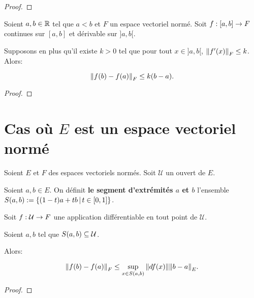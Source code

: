 \ifdefined\outputproof
\begin{proof}

\end{proof}
\fi

\begin{corollary}
	Soient $a, b \in \mathbb{R}$ tel que $a < b$ et $F$ un espace vectoriel normé.
	Soit $f : [a, b] \rightarrow F$ continues sur $[a, b]$ et dérivable sur
	$]a, b[$.

	Supposons en plus qu'il existe $k > 0$ tel que pour tout $x \in ]a, b[$,
	$\norm{f'(x)}_{F} \leq k$. Alors:

	\begin{equation*}
		\norm{f(b) - f(a)}_{F} \leq k (b - a).
	\end{equation*}
\end{corollary}

\ifdefined\outputproof
\begin{proof}

\end{proof}
\fi

\section{Cas où $E$ est un espace vectoriel normé}

Soient $E$ et $F$ des espaces vectoriels normés.
Soit $\mathcal{U}$ un ouvert de $E$.

\begin{definition}
	Soient $a, b \in E$. On définit \textbf{le segment d'extrémités $a$ et $b$}
	l'ensemble $S(a, b) := \left\{(1 - t) a + t b \, | \, t \in [0, 1] \right\}$.
\end{definition}

\begin{theorem} 
	Soit $f : \mathcal{U} \rightarrow F$ une application différentiable en tout
	point de $\mathcal{U}$.

	Soient $a, b$ tel que $S(a, b) \subseteq \mathcal{U}$.

	Alors:

	\begin{equation*}
		\norm{f(b) - f(a)}_{F} \leq \displaystyle \sup_{x \in S(a, b)}
		\norm{df(x)} \norm{b - a}_{E}.
	\end{equation*}

	\label{theorem:mean_value_theorem}
\end{theorem}

\ifdefined\outputproof
\begin{proof}

\end{proof}
\fi

